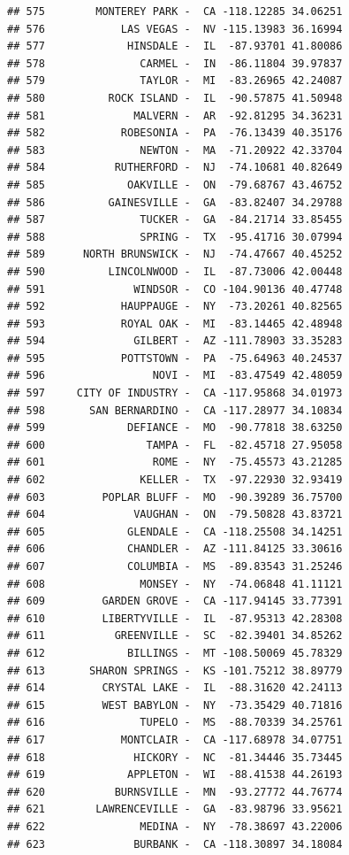 \documentclass{article}\usepackage[]{graphicx}\usepackage[]{color}
\makeatletter
\newenvironment{kframe}{%
 \def\at@end@of@kframe{}%
 \ifinner\ifhmode%
  \def\at@end@of@kframe{\end{minipage}}%
  \begin{minipage}{\columnwidth}%
 \fi\fi%
 \def\FrameCommand##1{\hskip\@totalleftmargin \hskip-\fboxsep
 \colorbox{shadecolor}{##1}\hskip-\fboxsep
     \hskip-\linewidth \hskip-\@totalleftmargin \hskip\columnwidth}%
 \MakeFramed {\advance\hsize-\width
   \@totalleftmargin\z@ \linewidth\hsize
   \@setminipage}}%
 {\par\unskip\endMakeFramed%
 \at@end@of@kframe}
\newenvironment{knitrout}{}{} %
\makeatother
\begin{document}
\begin{knitrout}
\begin{kframe}
\begin{verbatim}
## 575        MONTEREY PARK -  CA -118.12285 34.06251
## 576            LAS VEGAS -  NV -115.13983 36.16994
## 577             HINSDALE -  IL  -87.93701 41.80086
## 578               CARMEL -  IN  -86.11804 39.97837
## 579               TAYLOR -  MI  -83.26965 42.24087
## 580          ROCK ISLAND -  IL  -90.57875 41.50948
## 581              MALVERN -  AR  -92.81295 34.36231
## 582            ROBESONIA -  PA  -76.13439 40.35176
## 583               NEWTON -  MA  -71.20922 42.33704
## 584           RUTHERFORD -  NJ  -74.10681 40.82649
## 585             OAKVILLE -  ON  -79.68767 43.46752
## 586          GAINESVILLE -  GA  -83.82407 34.29788
## 587               TUCKER -  GA  -84.21714 33.85455
## 588               SPRING -  TX  -95.41716 30.07994
## 589      NORTH BRUNSWICK -  NJ  -74.47667 40.45252
## 590          LINCOLNWOOD -  IL  -87.73006 42.00448
## 591              WINDSOR -  CO -104.90136 40.47748
## 592            HAUPPAUGE -  NY  -73.20261 40.82565
## 593            ROYAL OAK -  MI  -83.14465 42.48948
## 594              GILBERT -  AZ -111.78903 33.35283
## 595            POTTSTOWN -  PA  -75.64963 40.24537
## 596                 NOVI -  MI  -83.47549 42.48059
## 597     CITY OF INDUSTRY -  CA -117.95868 34.01973
## 598       SAN BERNARDINO -  CA -117.28977 34.10834
## 599             DEFIANCE -  MO  -90.77818 38.63250
## 600                TAMPA -  FL  -82.45718 27.95058
## 601                 ROME -  NY  -75.45573 43.21285
## 602               KELLER -  TX  -97.22930 32.93419
## 603         POPLAR BLUFF -  MO  -90.39289 36.75700
## 604              VAUGHAN -  ON  -79.50828 43.83721
## 605             GLENDALE -  CA -118.25508 34.14251
## 606             CHANDLER -  AZ -111.84125 33.30616
## 607             COLUMBIA -  MS  -89.83543 31.25246
## 608               MONSEY -  NY  -74.06848 41.11121
## 609         GARDEN GROVE -  CA -117.94145 33.77391
## 610         LIBERTYVILLE -  IL  -87.95313 42.28308
## 611           GREENVILLE -  SC  -82.39401 34.85262
## 612             BILLINGS -  MT -108.50069 45.78329
## 613       SHARON SPRINGS -  KS -101.75212 38.89779
## 614         CRYSTAL LAKE -  IL  -88.31620 42.24113
## 615         WEST BABYLON -  NY  -73.35429 40.71816
## 616               TUPELO -  MS  -88.70339 34.25761
## 617            MONTCLAIR -  CA -117.68978 34.07751
## 618              HICKORY -  NC  -81.34446 35.73445
## 619             APPLETON -  WI  -88.41538 44.26193
## 620           BURNSVILLE -  MN  -93.27772 44.76774
## 621        LAWRENCEVILLE -  GA  -83.98796 33.95621
## 622               MEDINA -  NY  -78.38697 43.22006
## 623              BURBANK -  CA -118.30897 34.18084

\end{verbatim}
\end{kframe}
\end{knitrout}
\end{document}
